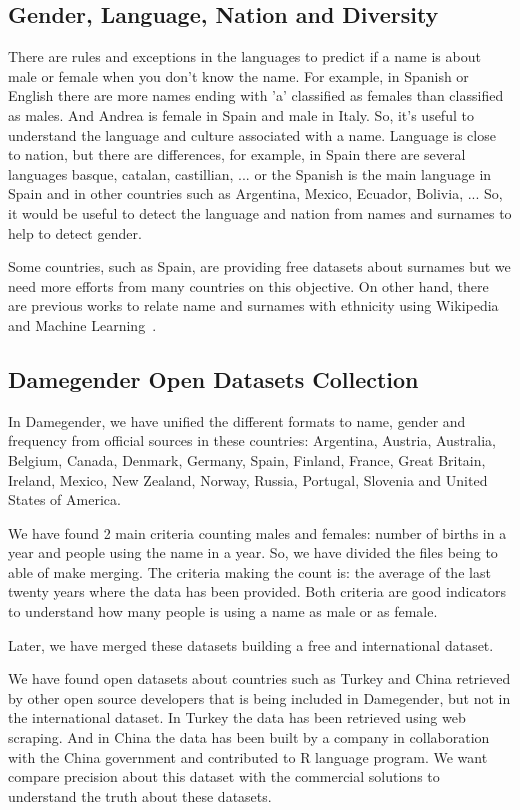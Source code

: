 \documentclass[a4paper]{article}
\begin{document}
\subsection{Gender, Language, Nation and Diversity}
\label{sec:diversity}

There are rules and exceptions in the languages to predict if a name
is about male or female when you don't know the name. For example, in
Spanish or English there are more names ending with 'a' classified as
females than classified as males. And Andrea is female in Spain and
male in Italy. So, it's useful to understand the language and culture
associated with a name. Language is close to nation, but there are
differences, for example, in Spain there are several languages basque,
catalan, castillian, ... or the Spanish is the main language in Spain
and in other countries such as Argentina, Mexico, Ecuador, Bolivia,
... So, it would be useful to detect the language and nation from
names and surnames to help to detect gender.

Some countries, such as Spain, are providing free datasets about
surnames but we need more efforts from many countries on this
objective. On other hand, there are previous works to relate name and
surnames with ethnicity using Wikipedia and Machine
Learning~\cite{ambekar2009name}.

\subsection{Damegender Open Datasets Collection}
\label{sec:damegender}

In Damegender, we have unified the different formats to name, gender
and frequency from official sources in these countries: Argentina,
Austria, Australia, Belgium, Canada, Denmark, Germany, Spain, Finland,
France, Great Britain, Ireland, Mexico, New Zealand, Norway, Russia,
Portugal, Slovenia and United States of America.

We have found 2 main criteria counting males and females: number of
births in a year and people using the name in a year. So, we have
divided the files being to able of make merging. The criteria making
the count is: the average of the last twenty years where the data has
been provided. Both criteria are good indicators to understand how
many people is using a name as male or as female.

Later, we have merged these datasets building a free and international
dataset.

We have found open datasets about countries such as Turkey and China
retrieved by other open source developers that is being included in
Damegender, but not in the international dataset. In Turkey the data
has been retrieved using web scraping. And in China the data has been
built by a company in collaboration with the China government and
contributed to R language program. We want compare precision about
this dataset with the commercial solutions to understand the truth
about these datasets.
\end{document}
